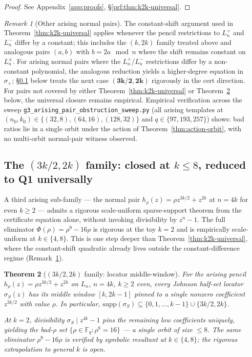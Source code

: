 \documentclass[11pt]{article}
\newtheorem{theorem}{Theorem}[section]
\theoremstyle{definition}
\theoremstyle{remark}
\newtheorem{remark}[theorem]{Remark}
\newcommand{\FF}{\mathbb{F}}
\begin{document}
\begin{proof}[Proof] See Appendix~\ref{app:proofs}, \S\ref{prf:thm:k2k-universal}.\end{proof}

\begin{remark}[Other arising normal pairs]
\label{rem:other-normal}
The constant-shift argument used in Theorem~\ref{thm:k2k-universal}
applies whenever the pencil restrictions to $L_n^+$ and $L_n^-$ differ
by a constant; this includes the $(k, 2k)$ family treated above and
analogous pairs $(a, b)$ with $b = 2a \mod n$ where the shift remains
constant on $L_n^\pm$. For arising normal pairs where the
$L_n^+$/$L_n^-$ restrictions differ by a non-constant polynomial, the
analogous reduction yields a higher-degree equation in $\sigma_+$;
\S\ref{ssec:3k2-cert} below treats the next case
$\boldsymbol{(3k/2, 2k)}$ rigorously in the cert direction. For pairs
not covered by either Theorem~\ref{thm:k2k-universal} or
Theorem~\ref{thm:3k2-cert} below, the universal closure remains
empirical. Empirical verification across the sweep
\texttt{g3\_arising\_pair\_obstruction\_sweep.py} (all arising templates
at $(n_0, k_0) \in \{(32, 8), (64, 16), (128, 32)\}$ and $q \in \{97,
193, 257\}$) shows: bad ratios lie in a single orbit under the action
of Theorem~\ref{thm:action-orbit}, with no multi-orbit normal-pair
witness observed.
\end{remark}

\subsection{The $(3k/2, 2k)$ family: closed at $k \leq 8$, reduced to Q1 universally}
\label{ssec:3k2-cert}

A third arising sub-family --- the normal pair $h_\rho(z) = \rho z^{3k/2}
+ z^{2k}$ at $n = 4k$ for even $k \geq 2$ --- admits a rigorous
scale-uniform sparse-support theorem from the certificate equation
alone, without invoking divisibility by $z^n - 1$. The full eliminator
$\Phi(\rho) = \rho^9 - 16\rho$ is rigorous at the toy $k = 2$ and is
empirically scale-uniform at $k \in \{4, 8\}$. This is one step deeper
than Theorem~\ref{thm:k2k-universal}, where the constant-shift quadratic
already lives outside the constant-difference regime
(Remark~\ref{rem:other-normal}).

\begin{theorem}[$(3k/2, 2k)$ family: locator middle-window]
\label{thm:3k2-cert}
For the arising pencil $h_\rho(z) = \rho z^{3k/2} + z^{2k}$ on
$L_n$, $n = 4k$, $k \geq 2$ even, every Johnson half-set locator
$\sigma_S(z)$ has its middle window $[k, 2k-1]$ pinned to a single
nonzero coefficient $z^{3k/2}$ with value $\rho$. In particular,
$\mathrm{supp}(\sigma_S) \subseteq \{0, 1, \ldots, k-1\} \cup
\{3k/2, 2k\}$.

At $k = 2$, divisibility $\sigma_S \mid z^{4k} - 1$ pins the
remaining low coefficients uniquely, yielding the bad-$\rho$ set
$\{\rho \in \FF_q : \rho^8 = 16\}$ --- a single orbit of size $\leq 8$.
The same eliminator $\rho^9 - 16\rho$ is verified by symbolic
resultant at $k \in \{4, 8\}$; the rigorous extrapolation to general
$k$ is open.
\end{theorem}
\end{document}
